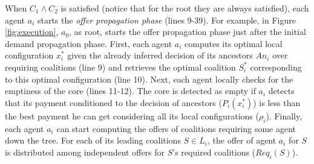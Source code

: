 \documentclass[11pt, twoside, titlepage, a4paper, openright]{report}
\begin{document}
When $C_1 \wedge C_2$ is satisfied (notice that for the root they are always
satisfied), each agent $a_i$ starts the \textit{offer propagation phase} (lines
9-39). 
For example, in Figure \ref{fig:execution}, $a_0$, as root, starts the offer
propagation phase just after the initial demand propagation phase.
First, each agent $a_i$ computes its
optimal local configuration $x^*_i$ given the already inferred decision
of its ancestors $An_i$ over requiring coalitions (line 9) and retrieves the
optimal coalition $S^*_i$ corresponding to this optimal configuration (line 10). 
Next, each agent locally checks for the emptiness of the core (lines 11-12). The
core is detected as empty if $a_i$ detects that its payment conditioned to the
decision of ancestors ($P_i(x^*_i)$) is less than the best payment he can get
considering all its local configurations ($\rho_i$).
Finally, each agent $a_i$ can start computing the offers of coalitions
requiring some agent down the tree.
For each of its leading coalitions $S\in L_i$, the offer of agent $a_i$
for $S$ is distributed among
independent offers for $S$'s required coalitions ($Req_i(S)$).
\end{document}
